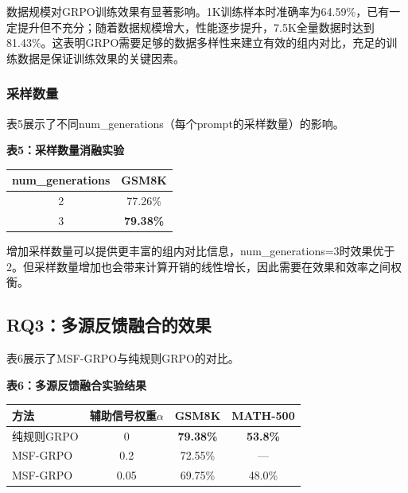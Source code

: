\documentclass[10.5pt]{article}
\begin{document}
数据规模对GRPO训练效果有显著影响。1K训练样本时准确率为64.59\%，已有一定提升但不充分；随着数据规模增大，性能逐步提升，7.5K全量数据时达到81.43\%。这表明GRPO需要足够的数据多样性来建立有效的组内对比，充足的训练数据是保证训练效果的关键因素。

\subsubsection{采样数量}

表5展示了不同num\_generations（每个prompt的采样数量）的影响。

\begin{center}
\textbf{表5：采样数量消融实验}
\end{center}

\begin{center}
\begin{tabular}{cc}
\hline
\textbf{num\_generations} & \textbf{GSM8K} \\
\hline
2 & 77.26\% \\
3 & \textbf{79.38\%} \\
\hline
\end{tabular}
\end{center}

增加采样数量可以提供更丰富的组内对比信息，num\_generations=3时效果优于2。但采样数量增加也会带来计算开销的线性增长，因此需要在效果和效率之间权衡。

\subsection{RQ3：多源反馈融合的效果}

表6展示了MSF-GRPO与纯规则GRPO的对比。

\begin{center}
\textbf{表6：多源反馈融合实验结果}
\end{center}

\begin{center}
\begin{tabular}{lccc}
\hline
\textbf{方法} & \textbf{辅助信号权重$\alpha$} & \textbf{GSM8K} & \textbf{MATH-500} \\
\hline
纯规则GRPO & 0 & \textbf{79.38\%} & \textbf{53.8\%} \\
MSF-GRPO & 0.2 & 72.55\% & --- \\
MSF-GRPO & 0.05 & 69.75\% & 48.0\% \\
\hline
\end{tabular}
\end{center}
\end{document}
